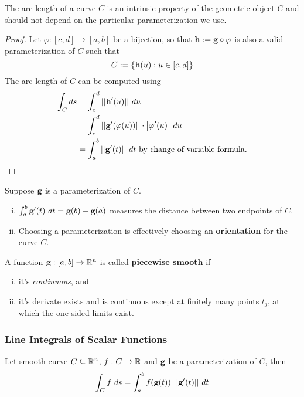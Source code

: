 \documentclass[11pt]{article}
\begin{document}
			\begin{proposition}
				The arc length of a curve $C$ is an intrinsic property of the geometric object $C$ and should not depend on the particular parameterization we use.
				\begin{proof}
					Let $\varphi:[c,d] \to [a,b]$ be a bijection, so that $\textbf{h} := \textbf{g} \circ \varphi$ is also a valid parameterization of $C$ such that
					\begin{equation}
						C := \{\textbf{h}(u): u \in [c, d]\}
					\end{equation}
					The arc length of $C$ can be computed using
					\begin{align}
						\int_C ds &= \int_c^d \vert \vert {\textbf{h}'(u)} \vert \vert\ du \\
						&= \int_c^d \vert \vert {\textbf{g}'(\varphi(u))} \vert \vert \cdot \big \vert {\varphi'(u)} \big \vert\ du \\
						&= \int_a^b \vert \vert {\textbf{g}'(t)} \vert \vert\ dt \text{{ by change of variable formula.}}
					\end{align}
				\end{proof}
			\end{proposition}
			
			\begin{remark}[Interpretations]Suppose $\textbf{g}$ is a parameterization of $C$.
				\begin{enumerate}[(i)]
					\item $\int_a^b \textbf{g}'(t)\ dt = \textbf{g}(b) - \textbf{g}(a)$ measures the distance between two endpoints of $C$. 
					\item Choosing a parameterization is effectively choosing an \textbf{orientation} for the curve $C$.
				\end{enumerate}
			\end{remark}
			
			\begin{definition}
				A function $\textbf{g}: [a, b] \to \mathbb{R}^n$ is called \textbf{piecewise smooth} if 
				\begin{enumerate}[(i)]
					\item it's \emph{continuous}, and 
					\item it's derivate exists and is continuous except at finitely many points $t_j$, at which the \ul{one-sided limits exist}.
				\end{enumerate}
			\end{definition}
		
		\subsubsection{Line Integrals of Scalar Functions}
			\begin{definition} Let smooth curve $C \subseteq \mathbb{R}^n$, $f: C \to \mathbb{R}$ and $\textbf{g}$ be a parameterization of $C$, then 
				\begin{equation}
					\int_C f\ ds = \int_a^b f(\ve{g}(t))\ \norm{\ve{g}'(t)}\ dt
				\end{equation}
			\end{definition}
			
\end{document}
